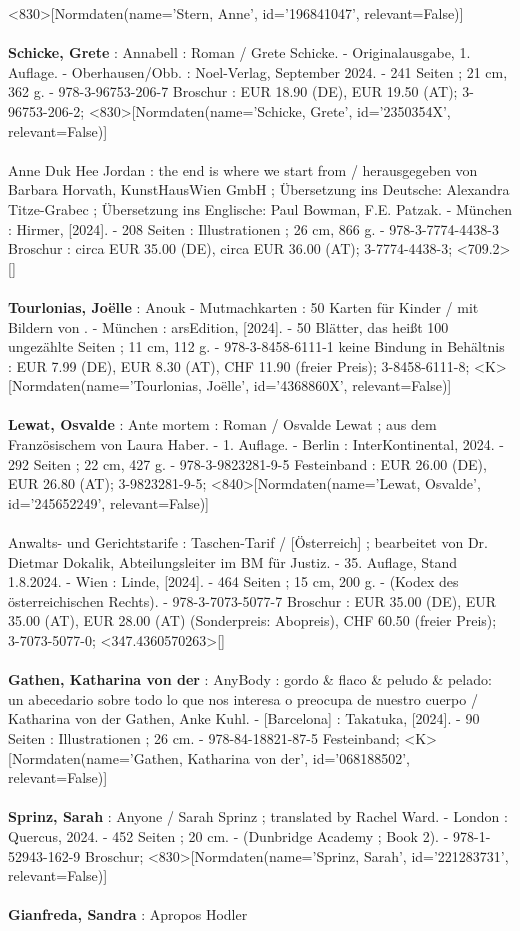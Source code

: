 \documentclass{article}
\begin{document}
\begin{multicols}{3}
<830>[Normdaten(name='Stern, Anne', id='196841047', relevant=False)]\\\\\textbf{Schicke, Grete} : Annabell : Roman / Grete Schicke. - Originalausgabe, 1. Auflage. - Oberhausen/Obb. : Noel-Verlag, September 2024. - 241 Seiten ; 21 cm, 362 g. - 978-3-96753-206-7 Broschur : EUR 18.90 (DE), EUR 19.50 (AT); 3-96753-206-2; <830>[Normdaten(name='Schicke, Grete', id='2350354X', relevant=False)]\\\\Anne Duk Hee Jordan : the end is where we start from / herausgegeben von Barbara Horvath, KunstHausWien GmbH ; Übersetzung ins Deutsche: Alexandra Titze-Grabec ; Übersetzung ins Englische: Paul Bowman, F.E. Patzak. - München : Hirmer, [2024]. - 208 Seiten : Illustrationen ; 26 cm, 866 g. - 978-3-7774-4438-3 Broschur : circa EUR 35.00 (DE), circa EUR 36.00 (AT); 3-7774-4438-3; <709.2>[]\\\\\textbf{Tourlonias, Joëlle} : Anouk - Mutmachkarten : 50 Karten für Kinder / mit Bildern von . - München : arsEdition, [2024]. - 50 Blätter, das heißt 100 ungezählte Seiten ; 11 cm, 112 g. - 978-3-8458-6111-1 keine Bindung in Behältnis : EUR 7.99 (DE), EUR 8.30 (AT), CHF 11.90 (freier Preis); 3-8458-6111-8; <K>[Normdaten(name='Tourlonias, Joëlle', id='4368860X', relevant=False)]\\\\\textbf{Lewat, Osvalde} : Ante mortem : Roman / Osvalde Lewat ; aus dem Französischem von Laura Haber. - 1. Auflage. - Berlin : InterKontinental, 2024. - 292 Seiten ; 22 cm, 427 g. - 978-3-9823281-9-5 Festeinband : EUR 26.00 (DE), EUR 26.80 (AT); 3-9823281-9-5; <840>[Normdaten(name='Lewat, Osvalde', id='245652249', relevant=False)]\\\\Anwalts- und Gerichtstarife : Taschen-Tarif / [Österreich] ; bearbeitet von Dr. Dietmar Dokalik, Abteilungsleiter im BM für Justiz. - 35. Auflage, Stand 1.8.2024. - Wien : Linde, [2024]. - 464 Seiten ; 15 cm, 200 g. - (Kodex des österreichischen Rechts). - 978-3-7073-5077-7 Broschur : EUR 35.00 (DE), EUR 35.00 (AT), EUR 28.00 (AT) (Sonderpreis: Abopreis), CHF 60.50 (freier Preis); 3-7073-5077-0; <347.4360570263>[]\\\\\textbf{Gathen, Katharina von der} : AnyBody : gordo \& flaco \& peludo \& pelado: un abecedario sobre todo lo que nos interesa o preocupa de nuestro cuerpo / Katharina von der Gathen, Anke Kuhl. - [Barcelona] : Takatuka, [2024]. - 90 Seiten : Illustrationen ; 26 cm. - 978-84-18821-87-5 Festeinband; <K>[Normdaten(name='Gathen, Katharina von der', id='068188502', relevant=False)]\\\\\textbf{Sprinz, Sarah} : Anyone / Sarah Sprinz ; translated by Rachel Ward. - London : Quercus, 2024. - 452 Seiten ; 20 cm. - (Dunbridge Academy ; Book 2). - 978-1-52943-162-9 Broschur; <830>[Normdaten(name='Sprinz, Sarah', id='221283731', relevant=False)]\\\\\textbf{Gianfreda, Sandra} : Apropos Hodler 
\end{multicols}
\end{document}
